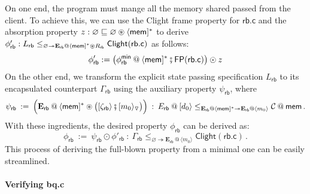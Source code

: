 \documentclass[acmsmall,screen,review,nonacm]{acmart}
\newcommand{\kw}[1]{\ensuremath{ \mathsf{#1} }}
\newcommand{\vcomp}{\fatsemi}
\newcommand{\sepconj}{\oast}
\begin{document}
On one end,
the program must mange
all the memory shared passed
from the client.
To achieve this,
we can use the Clight frame property for $\kw{rb.c}$
and the absorption property
$z : \varnothing \sqsubseteq \varnothing \sepconj \langle\kw{mem}]^*$
to derive
$\phi'_\kw{rb} : L_\kw{rb} \le_{\varnothing
  \twoheadrightarrow \mathbf{E}_\kw{rb} @ \langle\kw{mem}{]}^* \sepconj R_\kw{rb}}
\kw{Clight}(\kw{rb.c})
$ as follows:
\[
  \phi'_\kw{rb} :=
  \big(
    \phi_\kw{rb}^\kw{min} \mathbin@ \langle \kw{mem} ]^*
    \vcomp
    \kw{FP}(\kw{rb.c})
    \big) \odot z
\]%
On the other end,
we transform
the explicit state passing specification
$L_\kw{rb}$
to its encapsulated counterpart
$\Gamma_\kw{rb}$
using the auxiliary property
$\psi_\kw{rb}$,
where
\[
  \psi_\kw{rb} \: := \:
  \Big(
      \mathbf{E}_\kw{rb} \mathbin@
      \langle \kw{mem} ]^* \sepconj
      \big(
        [\zeta_\kw{rb} \rangle \vcomp [m_0\rangle_\triangledown
      \big)
      \Big)
      \: : \:
      E_\kw{rb} \mathbin@ [d_0\rangle
      \le_{\mathbf{E}_\kw{rb} \mathbin@ \langle \kw{mem}]^* \twoheadrightarrow
        \mathbf{E}_\kw{rb} \mathbin@ \langle m_0 \rangle}
      \mathcal{C} \mathbin@ \kw{mem}
  \,.
\]
With these ingredients,
the desired property $\phi_\kw{rb}$
can be derived as:
\[
  \phi_\kw{rb} \: := \:
    \psi_\kw{rb} \odot \phi'_\kw{rb}
  \: : \:
  \Gamma_\kw{rb}
    \le_{\varnothing \twoheadrightarrow
      \mathbf{E}_\kw{rb} \mathbin@
        \langle m_0 \rangle}
    \kw{Clight}(\kw{rb.c})
  \,.
\]
This process of
deriving the full-blown property
from a minimal one
can be easily streamlined.

\paragraph{Verifying bq.c}
\end{document}
